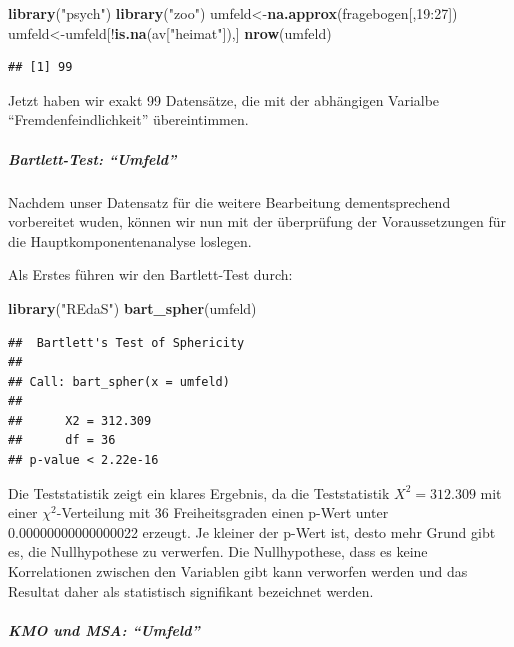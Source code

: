 \documentclass[]{article}
\newenvironment{Shaded}{\begin{snugshade}}{\end{snugshade}}
\newcommand{\KeywordTok}[1]{\textcolor[rgb]{0.13,0.29,0.53}{\textbf{{#1}}}}
\newcommand{\DecValTok}[1]{\textcolor[rgb]{0.00,0.00,0.81}{{#1}}}
\newcommand{\StringTok}[1]{\textcolor[rgb]{0.31,0.60,0.02}{{#1}}}
\newcommand{\NormalTok}[1]{{#1}}
\let\oldsubparagraph\subparagraph
\renewcommand{\subparagraph}[1]{\oldsubparagraph{#1}\mbox{}}
\begin{document}
\begin{Shaded}
\begin{Highlighting}[]
\KeywordTok{library}\NormalTok{(}\StringTok{"psych"}\NormalTok{)}
\KeywordTok{library}\NormalTok{(}\StringTok{"zoo"}\NormalTok{)}
\NormalTok{umfeld<-}\KeywordTok{na.approx}\NormalTok{(fragebogen[,}\DecValTok{19}\NormalTok{:}\DecValTok{27}\NormalTok{])}
\NormalTok{umfeld<-umfeld[!}\KeywordTok{is.na}\NormalTok{(av[}\StringTok{"heimat"}\NormalTok{]),]}
\KeywordTok{nrow}\NormalTok{(umfeld)}
\end{Highlighting}
\end{Shaded}

\begin{verbatim}
## [1] 99
\end{verbatim}

Jetzt haben wir exakt 99 Datensätze, die mit der abhängigen Varialbe
``Fremdenfeindlichkeit'' übereintimmen.

\subparagraph{\texorpdfstring{Bartlett-Test:
``Umfeld''}{Bartlett-Test: Umfeld}}\label{bartlett-test-umfeld}

Nachdem unser Datensatz für die weitere Bearbeitung dementsprechend
vorbereitet wuden, können wir nun mit der überprüfung der
Voraussetzungen für die Hauptkomponentenanalyse loslegen.

Als Erstes führen wir den Bartlett-Test durch:

\begin{Shaded}
\begin{Highlighting}[]
\KeywordTok{library}\NormalTok{(}\StringTok{"REdaS"}\NormalTok{)}
\KeywordTok{bart_spher}\NormalTok{(umfeld)}
\end{Highlighting}
\end{Shaded}

\begin{verbatim}
##  Bartlett's Test of Sphericity
## 
## Call: bart_spher(x = umfeld)
## 
##      X2 = 312.309
##      df = 36
## p-value < 2.22e-16
\end{verbatim}

Die Teststatistik zeigt ein klares Ergebnis, da die Teststatistik
\(X^2=312.309\) mit einer \(\chi^2\)-Verteilung mit 36 Freiheitsgraden
einen p-Wert unter 0.00000000000000022 erzeugt. Je kleiner der p-Wert
ist, desto mehr Grund gibt es, die Nullhypothese zu verwerfen. Die
Nullhypothese, dass es keine Korrelationen zwischen den Variablen gibt
kann verworfen werden und das Resultat daher als statistisch signifikant
bezeichnet werden.

\subparagraph{\texorpdfstring{KMO und MSA:
``Umfeld''}{KMO und MSA: Umfeld}}\label{kmo-und-msa-umfeld}
\end{document}
